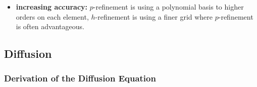\begin{itemize}
\begin{equation}
    \end{equation}
    so (integrate by parts and Gauss theorem)
    \begin{equation}
        \begin{gathered}
            \frac{d}{d t} \underbrace{\int_K \vec{u}^{(K)} \phi_j^K d V}_{\vec{w}_j^{(K)} \cdot |K|} + \sum_{\alpha=1}^3 \explain{\int_{\partial K} f_\alpha n_\alpha \phi_j^K d S}{evaluate using Gauss-Quad, unknown flux across discont. via Riemann solver} - \sum_{\alpha=1}^3 \explain{\int_K \vec{f}_\alpha \frac{\partial \phi_j^K}{\partial x_\alpha} d V}{evaluate via Gauss-Quad., interior flux known from state variable approx.} = 0 \\
            \text{normal vector } \vec{n} = \left( \begin{array}{c} n_1 \\ n_2 \\ n_3 \end{array} \right) \text{ on } \partial K
        \end{gathered}
    \end{equation}
    \item \textbf{increasing accuracy:} $p$-refinement is using a polynomial basis to higher orders on each element, $h$-refinement is using
    a finer grid where $p$-refinement is often advantageous.
\end{itemize}

\subsection*{Diffusion}
\subsubsection*{Derivation of the Diffusion Equation}
